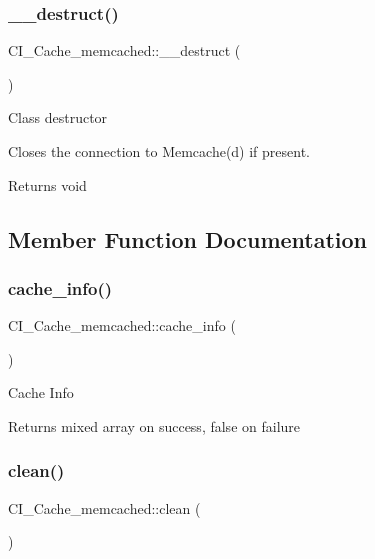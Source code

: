 \subsubsection{\texorpdfstring{\+\_\+\+\_\+destruct()}{\_\_destruct()}}
{\footnotesize\ttfamily C\+I\+\_\+\+Cache\+\_\+memcached\+::\+\_\+\+\_\+destruct (\begin{DoxyParamCaption}{ }\end{DoxyParamCaption})}

Class destructor

Closes the connection to Memcache(d) if present.

\begin{DoxyReturn}{Returns}
void 
\end{DoxyReturn}


\subsection{Member Function Documentation}
\mbox{\label{class_c_i___cache__memcached_a3153f976fda08ab1c88b208b20f05ef7}} 
\subsubsection{\texorpdfstring{cache\+\_\+info()}{cache\_info()}}
{\footnotesize\ttfamily C\+I\+\_\+\+Cache\+\_\+memcached\+::cache\+\_\+info (\begin{DoxyParamCaption}{ }\end{DoxyParamCaption})}

Cache Info

\begin{DoxyReturn}{Returns}
mixed array on success, false on failure 
\end{DoxyReturn}
\mbox{\label{class_c_i___cache__memcached_a05e8d2bb12401231b7593d807be0ecc8}} 
\subsubsection{\texorpdfstring{clean()}{clean()}}
{\footnotesize\ttfamily C\+I\+\_\+\+Cache\+\_\+memcached\+::clean (\begin{DoxyParamCaption}{ }\end{DoxyParamCaption})}

